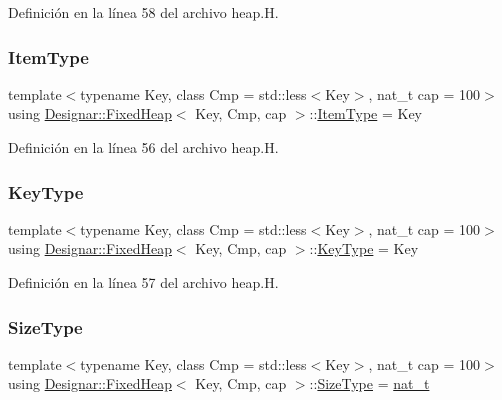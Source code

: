 Definición en la línea 58 del archivo heap.\+H.

\mbox{\label{class_designar_1_1_fixed_heap_adf444211fa73830a09b3847ebe15bc9b}} 
\subsubsection{\texorpdfstring{Item\+Type}{ItemType}}
{\footnotesize\ttfamily template$<$typename Key, class Cmp = std\+::less$<$\+Key$>$, nat\+\_\+t cap = 100$>$ \\
using \hyperlink{class_designar_1_1_fixed_heap}{Designar\+::\+Fixed\+Heap}$<$ Key, Cmp, cap $>$\+::\hyperlink{class_designar_1_1_fixed_heap_adf444211fa73830a09b3847ebe15bc9b}{Item\+Type} =  Key}



Definición en la línea 56 del archivo heap.\+H.

\mbox{\label{class_designar_1_1_fixed_heap_a2dbe3b22cba3e316803b614fba2d13e8}} 
\subsubsection{\texorpdfstring{Key\+Type}{KeyType}}
{\footnotesize\ttfamily template$<$typename Key, class Cmp = std\+::less$<$\+Key$>$, nat\+\_\+t cap = 100$>$ \\
using \hyperlink{class_designar_1_1_fixed_heap}{Designar\+::\+Fixed\+Heap}$<$ Key, Cmp, cap $>$\+::\hyperlink{class_designar_1_1_fixed_heap_a2dbe3b22cba3e316803b614fba2d13e8}{Key\+Type} =  Key}



Definición en la línea 57 del archivo heap.\+H.

\mbox{\label{class_designar_1_1_fixed_heap_a138d26dc24cbab61001f528a29b5154b}} 
\subsubsection{\texorpdfstring{Size\+Type}{SizeType}}
{\footnotesize\ttfamily template$<$typename Key, class Cmp = std\+::less$<$\+Key$>$, nat\+\_\+t cap = 100$>$ \\
using \hyperlink{class_designar_1_1_fixed_heap}{Designar\+::\+Fixed\+Heap}$<$ Key, Cmp, cap $>$\+::\hyperlink{class_designar_1_1_fixed_heap_a138d26dc24cbab61001f528a29b5154b}{Size\+Type} =  \hyperlink{namespace_designar_aa72662848b9f4815e7bf31a7cf3e33d1}{nat\+\_\+t}}



